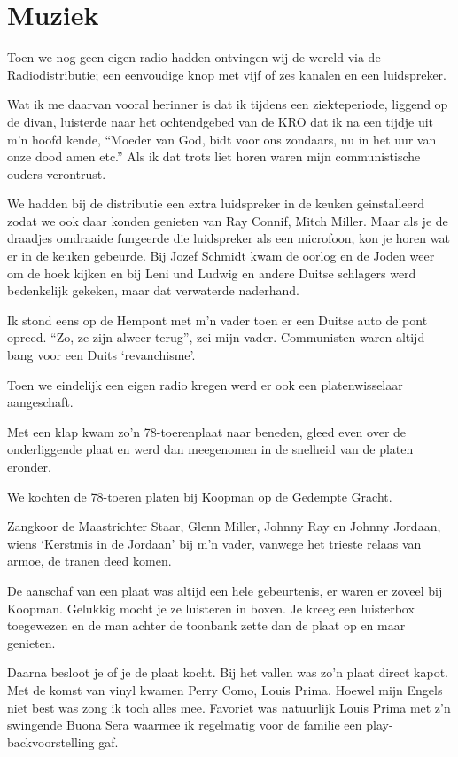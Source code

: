 \documentclass[10pt,twoside,openright]{memoir}
\begin{document}
\chapter{Muziek} %
\label{cha:muziek}

Toen we nog geen eigen radio hadden ontvingen wij de wereld via de Radiodistributie; een eenvoudige knop met vijf of zes kanalen en een luidspreker. 

Wat ik me daarvan vooral herinner is dat ik tijdens een ziekteperiode, liggend op de divan, luisterde naar het ochtendgebed van de KRO dat ik na een tijdje uit m’n hoofd kende, ``Moeder van God, bidt voor ons zondaars, nu in het uur van onze dood amen etc.'' Als ik dat trots liet horen waren mijn communistische ouders verontrust. 

We hadden bij de distributie een extra luidspreker in de keuken geinstalleerd zodat we ook daar konden genieten van Ray Connif, Mitch Miller. Maar als je de draadjes omdraaide fungeerde die luidspreker als een microfoon, kon je horen wat er in de keuken gebeurde. Bij Jozef Schmidt kwam de oorlog en de Joden weer om de hoek kijken en bij Leni und Ludwig en andere Duitse schlagers werd bedenkelijk gekeken, maar dat verwaterde naderhand. 

Ik stond eens op de Hempont met m’n vader toen er een Duitse auto de pont opreed. ``Zo, ze zijn alweer terug'', zei mijn vader. Communisten waren altijd bang voor een Duits ‘revanchisme’.

Toen we eindelijk een eigen radio kregen werd er ook een platenwisselaar aangeschaft. 

Met een klap kwam zo’n 78-toerenplaat naar beneden, gleed even over de onderliggende plaat en werd dan meegenomen in de snelheid van de platen eronder. 

We kochten de 78-toeren platen bij Koopman op de Gedempte Gracht. 

Zangkoor de Maastrichter Staar, Glenn Miller, Johnny Ray en Johnny Jordaan, wiens ‘Kerstmis in de Jordaan’ bij m’n vader, vanwege het trieste relaas van armoe, de tranen deed komen. 

De aanschaf van een plaat was altijd een hele gebeurtenis, er waren er zoveel bij Koopman. Gelukkig mocht je ze luisteren in boxen. Je kreeg een luisterbox toegewezen en de man achter de toonbank zette dan de plaat op en maar genieten. 

Daarna besloot je of je de plaat kocht. Bij het vallen was zo’n plaat direct kapot. Met de komst van vinyl kwamen Perry Como, Louis Prima. Hoewel mijn Engels niet best was zong ik toch alles mee. Favoriet was natuurlijk Louis Prima met z’n swingende Buona Sera waarmee ik regelmatig voor de familie een play-backvoorstelling gaf.
\end{document}

